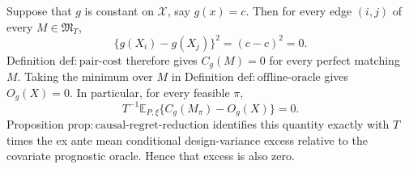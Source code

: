 Suppose that \(g\) is constant on \(\mathcal X\), say \(g(x)=c\).  Then for every edge \((i,j)\) of every \(M\in\mathfrak M_T\),
\[
\{g(X_i)-g(X_j)\}^2=(c-c)^2=0.
\]
Definition \(\mathrm{def:pair\text{-}cost}\) therefore gives \(C_g(M)=0\) for every perfect matching \(M\).  Taking the minimum over \(M\) in Definition \(\mathrm{def:offline\text{-}oracle}\) gives \(O_g(X)=0\).  In particular, for every feasible \(\pi\),
\[
T^{-1}\mathbb E_{P,\xi}\{C_g(M_\pi)-O_g(X)\}=0.
\]
Proposition \(\mathrm{prop:causal\text{-}regret\text{-}reduction}\) identifies this quantity exactly with \(T\) times the ex ante mean conditional design-variance excess relative to the covariate prognostic oracle.  Hence that excess is also zero.
